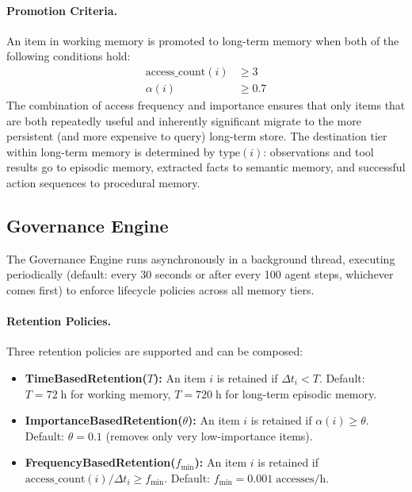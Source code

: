 \documentclass[review,12pt]{elsarticle}
\begin{document}
\paragraph{Promotion Criteria.}
An item in working memory is promoted to long-term memory when both of the
following conditions hold:
\begin{align}
  \text{access\_count}(i) &\geq 3 \label{eq:promotion-count} \\
  \alpha(i) &\geq 0.7 \label{eq:promotion-importance}
\end{align}
The combination of access frequency and importance ensures that only items that
are both repeatedly useful and inherently significant migrate to the more
persistent (and more expensive to query) long-term store.  The destination tier
within long-term memory is determined by $\text{type}(i)$: observations and
tool results go to episodic memory, extracted facts to semantic memory, and
successful action sequences to procedural memory.

\subsection{Governance Engine}
\label{subsec:governance}

The Governance Engine runs asynchronously in a background thread, executing
periodically (default: every 30 seconds or after every 100 agent steps,
whichever comes first) to enforce lifecycle policies across all memory tiers.

\paragraph{Retention Policies.}
Three retention policies are supported and can be composed:
\begin{itemize}
  \item \textbf{TimeBasedRetention($T$):} An item $i$ is retained if
  $\Delta t_i < T$.  Default: $T = 72\;\text{h}$ for working memory,
  $T = 720\;\text{h}$ for long-term episodic memory.
  \item \textbf{ImportanceBasedRetention($\theta$):} An item $i$ is retained
  if $\alpha(i) \geq \theta$.  Default: $\theta = 0.1$ (removes only very
  low-importance items).
  \item \textbf{FrequencyBasedRetention($f_{\min}$):} An item $i$ is retained
  if $\text{access\_count}(i) / \Delta t_i \geq f_{\min}$.  Default:
  $f_{\min} = 0.001\;\text{accesses/h}$.
\end{itemize}
\end{document}
